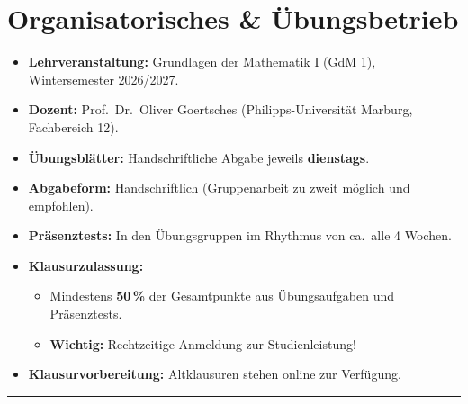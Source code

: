 
\section*{Organisatorisches \& Übungsbetrieb}

\begin{itemize}
    \item \textbf{Lehrveranstaltung:} Grundlagen der Mathematik I (GdM 1), Wintersemester 2026/2027.
    \item \textbf{Dozent:} Prof.~Dr.~Oliver Goertsches (Philipps-Universität Marburg, Fachbereich 12).
    \item \textbf{Übungsblätter:} Handschriftliche Abgabe jeweils \textbf{dienstags}.
    \item \textbf{Abgabeform:} Handschriftlich (Gruppenarbeit zu zweit möglich und empfohlen).
    \item \textbf{Präsenztests:} In den Übungsgruppen im Rhythmus von ca.~alle 4 Wochen.
    \item \textbf{Klausurzulassung:} 
    \begin{itemize}
        \item Mindestens \textbf{50\,\%} der Gesamtpunkte aus Übungsaufgaben und Präsenztests.
        \item \textbf{Wichtig:} Rechtzeitige Anmeldung zur Studienleistung!
    \end{itemize}
    \item \textbf{Klausurvorbereitung:} Altklausuren stehen online zur Verfügung.
\end{itemize}

\vspace{0.5em}
\hrule
\vspace{0.8em}
